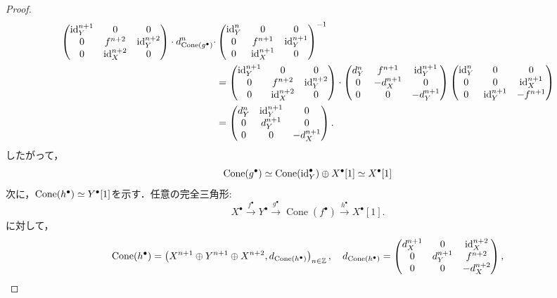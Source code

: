 \begin{proof}
\begin{align*}
	\begin{pmatrix}
		\mathrm{id}^{n+1}_Y & 0 & 0\\
		0 & f^{n+2} & \mathrm{id}^{n+2}_{Y} \\
		0 & \mathrm{id}^{n+2}_{X} & 0
	\end{pmatrix}\cdot
	d^n_{\operatorname{\mathrm{Cone}}({g^\bullet})} 
	\cdot &
	\begin{pmatrix}
		\mathrm{id}^{n}_Y & 0 & 0\\
		0 & f^{n+1} & \mathrm{id}^{n+1}_Y \\
		0 & \mathrm{id}^{n+1}_{X} & 0
	\end{pmatrix}^{-1} \\
	&=\begin{pmatrix}
		\mathrm{id}^{n+1}_Y & 0 & 0\\
		0 & f^{n+2} & \mathrm{id}^{n+2}_Y \\
		0 & \mathrm{id}^{n+2}_X & 0
	\end{pmatrix}\cdot
	\begin{pmatrix}
		d^{n}_Y & f^{n+1} & \mathrm{id}^{n+1}_{Y}\\
		0 & -d^{n+1}_{X} & 0\\
		0 & 0 &-d^{n+1}_Y
	\end{pmatrix} 
	\begin{pmatrix}
		\mathrm{id}^n_{Y} & 0 & 0\\
		0 & 0 & \mathrm{id}^{n+1}_{X} \\
		0 & \mathrm{id}^{n+1}_Y & -f^{n+1}
	\end{pmatrix}\\
	&=
	\begin{pmatrix}
		d^n_Y &	\mathrm{id}^{n+1}_Y & 0\\
		0 &	d^{n+1}_Y & 0\\
		0 &	0 & -d^{n+1}_X\\
	\end{pmatrix}.
\end{align*}
したがって，
\[\operatorname{\mathrm{Cone}}(g^\bullet)\simeq \operatorname{\mathrm{Cone}}(\mathrm{id}^{\bullet}_Y)\oplus X^\bullet[1]\simeq X^\bullet[1]\]
次に，$\operatorname{\mathrm{Cone}}(h^\bullet)\simeq Y^\bullet[1]$を示す．任意の完全三角形:
  \[
		X^\bullet \xrightarrow{f^\bullet} Y^\bullet \xrightarrow{g^\bullet} \operatorname{Cone}(f^\bullet) \xrightarrow{h^\bullet} X^\bullet[1].
  \]
	に対して，
	\[\operatorname{\mathrm{Cone}}(h^\bullet) = \left(X^{n+1}\oplus Y^{n+1}\oplus X^{n+2},d_{\operatorname{\mathrm{Cone}}(h^\bullet)}\right)_{n\in{\mathbb Z}},\quad
	d_{\operatorname{\mathrm{Cone}}({h^\bullet})} = 
	\begin{pmatrix}
		d^{n+1}_X & 0 & \mathrm{id}^{n+2}_{X}\\
		0 & d^{n+1}_Y & f^{n+2}\\
		0 & 0 &-d^{n+2}_X
	\end{pmatrix},\]

\end{proof}
